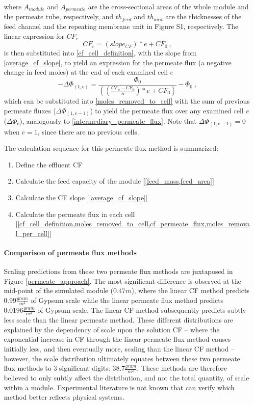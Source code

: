 where $A_{module}$ and $A_{permeate}$ are the cross-sectional areas of the whole module and the permeate tube, respectively, and $th_{feed}$ and $th_{unit}$ are the thicknesses of the feed channel and the repeating membrane unit in Figure S1, respectively. The linear expression for $CF_e$ 
\begin{equation} \label{cf_permeate_flux}
    CF_e=(slope_{CF})*e+CF_{0}~,
\end{equation}
is then substituted into \cref{cf_cell_definition}, with the slope from \cref{average_cf_slope}, to yield an expression for the permeate flux (a negative change in feed moles) at the end of each examined cell $e$
\begin{equation} \label{moles_removal_per_cell} 
    -\Delta \Phi_{(1,e)}=\frac{\Phi_0}{((\frac{CF_{n}-CF_{0}}{n})*e+CF_{0})}-\Phi_0~,
\end{equation}
which can be substituted into \cref{moles_removed_to_cell} with the sum of previous permeate fluxes ($\Delta \Phi_{(1,e-1)}$) to yield the permeate flux over any examined cell $e$ ($\Delta \Phi_{e}$), analogously to \cref{intermediary_permeate_flux}. Note that $\Delta \Phi_{(1,e-1)}=0$ when $e=1$, since there are no previous cells. 

The calculation sequence for this permeate flux method is summarized:
\begin{enumerate}
    \item Define the effluent CF
    \item Calculate the feed capacity of the module [\cref{feed_mass,feed_area}]
    \item Calculate the CF slope [\cref{average_cf_slope}]
    \item Calculate the permeate flux in each cell [\cref{cf_cell_definition,moles_removed_to_cell,cf_permeate_flux,moles_removal_per_cell}]
\end{enumerate}

\paragraph{Comparison of permeate flux methods}
Scaling predictions from these two permeate flux methods are juxtaposed in Figure \ref{permeate_approach}. The most significant difference is observed at the mid-point of the simulated module ($0.47 m$), where the linear CF method predicts $0.99 \frac{gram}{m^2}$ of Gypsum scale while the linear permeate flux method predicts $0.0196 \frac{gram}{m^2}$ of Gypsum scale. The linear CF method subsequently predicts subtly less scale than the linear permeate method. These different distributions are explained by the dependency of scale upon the solution CF -- where the exponential increase in CF through the linear permeate flux method causes initially less, and then eventually more, scaling than the linear CF method -- however, the scale distribution ultimately equates between these two permeate flux methods to 3 significant digits: $38.7 \frac{gram}{m^2}$. These methods are therefore believed to only subtly affect the distribution, and not the total quantity, of scale within a module. Experimental literature is not known that can verify which method better reflects physical systems. 

